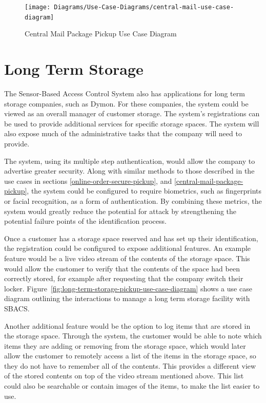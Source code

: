 \documentclass[12pt]{report}
\let\Oldsection\section
\renewcommand{\section}{\FloatBarrier\Oldsection}
\begin{document}
\begin{figure}
    \texttt{[image: Diagrams/Use-Case-Diagrams/central-mail-use-case-diagram]}
    \caption{Central Mail Package Pickup Use Case Diagram}
    \label{fig:central-mail-use-case-diagram}
\end{figure}


\section{Long Term Storage} \label{long-term-storage}

The Sensor-Based Access Control System also has applications for long term storage companies, such as Dymon. For these 
companies, the system could be viewed as an overall manager of customer storage. The system's registrations can be used 
to provide additional services for specific storage spaces. The system will also expose much of the administrative 
tasks that the company will need to provide.

The system, using its multiple step authentication, would allow the company to advertise greater security. Along with
similar methods to those described in the use cases in sections \ref{online-order-secure-pickup}, and
\ref{central-mail-package-pickup}, the system could be configured to require biometrics, such
as fingerprints or facial recognition, as a form of authentication. By combining these metrics, the system would greatly
reduce the potential for attack by strengthening the potential failure points of the identification process.

Once a customer has a storage space reserved and has set up their identification, the registration could be configured
to expose additional features. An example feature would be a live video stream of the contents of the storage space.
This would allow the customer to verify that the contents of the space had been correctly stored, for example after
requesting that the company switch their locker. Figure~\ref{fig:long-term-storage-pickup-use-case-diagram} shows
a use case diagram outlining the interactions to manage a long term storage facility with SBACS.

Another additional feature would be the option to log items that are stored in the storage space. Through the system, the
customer would be able to note which items they are adding or removing from the storage space, which would later allow the
customer to remotely access a list of the items in the storage space, so they do not have to remember all of the contents.
This provides a different view of the stored contents on top of the video stream mentioned above. This list could also be
searchable or contain images of the items, to make the list easier to use.
\end{document}
